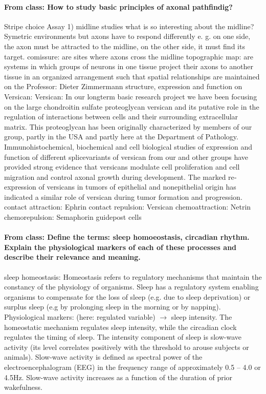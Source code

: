 \documentclass[12pt,article,oneside,a4paper]{memoir}
\begin{document}
\paragraph{From class: How to study basic principles of axonal pathfindig?} Stripe choice Assay 
1) midline studies
what is so interesting about the midline? Symetric environments but axons have to respond
differently e. g. on one side, the axon must be attracted to the midline, on the other side, it must find its target. comissure: are sites where axons cross the midline
topographic map: are systems in which groups of neurons in one tissue project their axons to another tissue in an organized arrangement such that spatial relationships are maintained
on the Professor: Dieter Zimmermann structure, expression and function on Versican: Versican: In our long­term basic research project we have been focusing on the large chondroitin sulfate proteoglycan versican and its putative role in the regulation of interactions between cells and their surrounding
extracellular matrix. This proteoglycan has been originally characterized by members of our group, partly in the USA and partly here at the Department of Pathology. Immunohistochemical, biochemical and cell biological studies of expression and function of different splice­variants of versican from our and other groups have provided strong evidence that versicans modulate cell proliferation and cell migration and control axonal growth during development. The marked re­expression of versicans in tumors of epithelial and non­epithelial origin has indicated a similar role of versican during tumor formation and progression.
contact attraction: Ephrin
contact repulsion: Versican
chemoattraction: Netrin
chemorepulsion: Semaphorin
guidepost cells

\paragraph{From class: Define the terms: sleep homoeostasis, circadian rhythm. Explain the physiological markers of each of these processes and describe their relevance and meaning.} sleep homeostasis: Homeostasis refers to regulatory mechanisms that maintain the constancy of the physiology of organisms. Sleep has a regulatory system enabling organisms to compensate for the loss of sleep (e.g. due to sleep deprivation) or surplus sleep (e.g by prolonging sleep in the morning or by napping). %
Physiological markers: (here: regulated variable) $\rightarrow$ sleep intensity. The homeostatic mechanism regulates sleep intensity, while the circadian clock regulates the timing of sleep.
The intensity component of sleep is slow-wave activity (its level correlates positively with the threshold to arouse subjects or animals). Slow-wave activity is defined as spectral power of the electroencephalogram (EEG) in the frequency range of approximately 0.5 – 4.0 or 4.5Hz. Slow-wave activity increases as a function of the duration of prior wakefulness.
\end{document}
